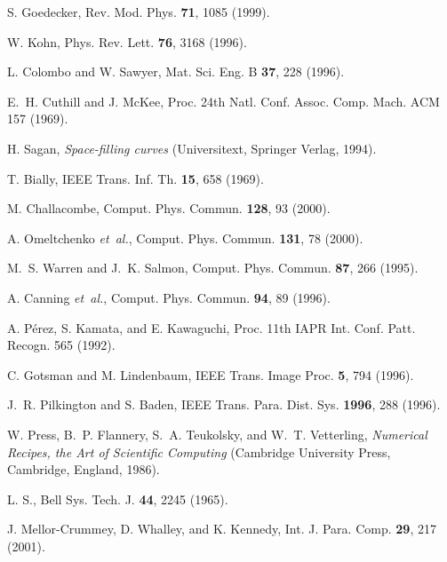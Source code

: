 \documentclass[preprint,showpacs,amssymb,aps]{revtex4}
\begin{document}

\begin{thebibliography}{10}

S. Goedecker, Rev. Mod. Phys. {\bf 71},  1085  (1999).

W. Kohn, Phys. Rev. Lett. {\bf 76},  3168  (1996).

L. Colombo and W. Sawyer, Mat. Sci. Eng. B {\bf 37},  228  (1996).

E.~H. Cuthill and J. McKee, Proc. 24th Natl. Conf. Assoc. Comp. Mach. ACM  157
  (1969).

H. Sagan, {\em Space-filling curves} (Universitext, Springer Verlag, 1994).

T. Bially, IEEE Trans. Inf. Th. {\bf 15},  658  (1969).

M. Challacombe, Comput. Phys. Commun. {\bf 128},  93  (2000).

A. Omeltchenko {\it et~al.}, Comput. Phys. Commun. {\bf 131},  78  (2000).

M.~S. Warren and J.~K. Salmon, Comput. Phys. Commun. {\bf 87},  266  (1995).

A. Canning {\it et~al.}, Comput. Phys. Commun. {\bf 94},  89  (1996).

A. P\'{e}rez, S. Kamata, and E. Kawaguchi, Proc. 11th IAPR Int. Conf. Patt.
  Recogn.  565  (1992).

C. Gotsman and M. Lindenbaum, IEEE Trans. Image Proc. {\bf 5},  794  (1996).

J.~R. Pilkington and S. Baden, IEEE Trans. Para. Dist. Sys. {\bf 1996},  288
  (1996).

W. Press, B.~P. Flannery, S.~A. Teukolsky, and W.~T. Vetterling, {\em Numerical
  Recipes, the Art of Scientific Computing} (Cambridge University Press,
  Cambridge, England, 1986).

L. S., Bell Sys. Tech. J. {\bf 44},  2245  (1965).

J. Mellor-Crummey, D. Whalley, and K. Kennedy, Int. J. Para. Comp. {\bf 29},
  217  (2001).

\end{thebibliography}
\end{document}

